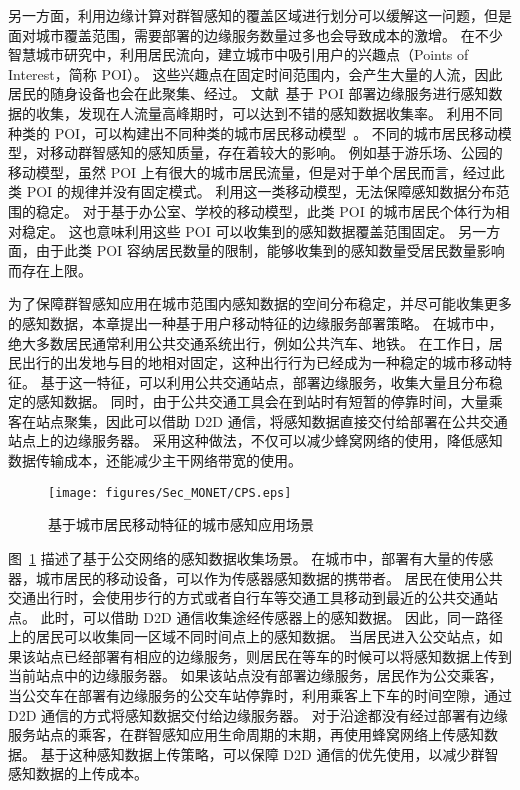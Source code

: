 另一方面，利用边缘计算对群智感知的覆盖区域进行划分可以缓解这一问题，但是面对城市覆盖范围，需要部署的边缘服务数量过多也会导致成本的激增。
在不少智慧城市研究中，利用居民流向，建立城市中吸引用户的兴趣点（Points of Interest，简称 POI）。
这些兴趣点在固定时间范围内，会产生大量的人流，因此居民的随身设备也会在此聚集、经过。
文献~基于 POI 部署边缘服务进行感知数据的收集，发现在人流量高峰期时，可以达到不错的感知数据收集率。
利用不同种类的 POI，可以构建出不同种类的城市居民移动模型~\cite{CNKI:XiongOMCS}。
不同的城市居民移动模型，对移动群智感知的感知质量，存在着较大的影响。
例如基于游乐场、公园的移动模型，虽然 POI 上有很大的城市居民流量，但是对于单个居民而言，经过此类 POI 的规律并没有固定模式。
利用这一类移动模型，无法保障感知数据分布范围的稳定。
对于基于办公室、学校的移动模型，此类 POI 的城市居民个体行为相对稳定。
这也意味利用这些 POI 可以收集到的感知数据覆盖范围固定。
另一方面，由于此类 POI 容纳居民数量的限制，能够收集到的感知数量受居民数量影响而存在上限。

为了保障群智感知应用在城市范围内感知数据的空间分布稳定，并尽可能收集更多的感知数据，本章提出一种基于用户移动特征的边缘服务部署策略。
在城市中，绝大多数居民通常利用公共交通系统出行，例如公共汽车、地铁。
在工作日，居民出行的出发地与目的地相对固定，这种出行行为已经成为一种稳定的城市移动特征。
基于这一特征，可以利用公共交通站点，部署边缘服务，收集大量且分布稳定的感知数据。
同时，由于公共交通工具会在到站时有短暂的停靠时间，大量乘客在站点聚集，因此可以借助 D2D 通信，将感知数据直接交付给部署在公共交通站点上的边缘服务器。
采用这种做法，不仅可以减少蜂窝网络的使用，降低感知数据传输成本，还能减少主干网络带宽的使用。

\begin{figure}[!h]
\centering
\vspace{-1em}
\texttt{[image: figures/Sec\_MONET/CPS.eps]}
\vspace{-0.5em}
\caption{基于城市居民移动特征的城市感知应用场景}
\vspace{-1.5em}
\label{Figure_edge}
\end{figure}

图~\ref{Figure_edge} 描述了基于公交网络的感知数据收集场景。
在城市中，部署有大量的传感器，城市居民的移动设备，可以作为传感器感知数据的携带者。
居民在使用公共交通出行时，会使用步行的方式或者自行车等交通工具移动到最近的公共交通站点。
此时，可以借助 D2D 通信收集途经传感器上的感知数据。
因此，同一路径上的居民可以收集同一区域不同时间点上的感知数据。
当居民进入公交站点，如果该站点已经部署有相应的边缘服务，则居民在等车的时候可以将感知数据上传到当前站点中的边缘服务器。
如果该站点没有部署边缘服务，居民作为公交乘客，当公交车在部署有边缘服务的公交车站停靠时，利用乘客上下车的时间空隙，通过 D2D 通信的方式将感知数据交付给边缘服务器。
对于沿途都没有经过部署有边缘服务站点的乘客，在群智感知应用生命周期的末期，再使用蜂窝网络上传感知数据。
基于这种感知数据上传策略，可以保障 D2D 通信的优先使用，以减少群智感知数据的上传成本。

